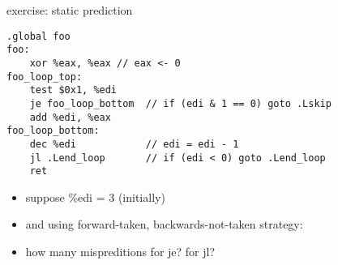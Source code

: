 \begin{frame}[fragile,label=staticPredictEx]{exercise: static prediction}
\begin{lstlisting}[language=myasm,style=smaller]
.global foo
foo:
    xor %eax, %eax // eax <- 0
foo_loop_top:
    test $0x1, %edi
    je foo_loop_bottom  // if (edi & 1 == 0) goto .Lskip
    add %edi, %eax 
foo_loop_bottom:
    dec %edi            // edi = edi - 1
    jl .Lend_loop       // if (edi < 0) goto .Lend_loop
    ret
\end{lstlisting}
\begin{itemize}
\item suppose \%edi = 3 (initially)
\item and using forward-taken, backwards-not-taken strategy:
\item how many mispreditions for je? for jl?
\end{itemize}
\end{frame}
